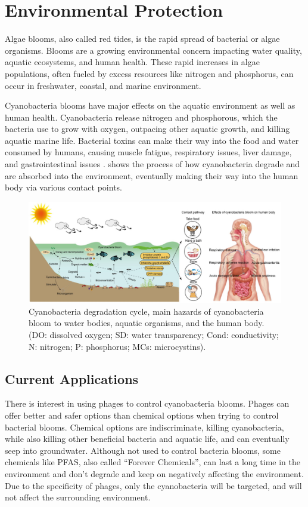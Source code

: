 \section{Environmental Protection}
\label{sec:AppendixB:environmental_protection}
Algae blooms, also called red tides, is the rapid spread of bacterial or algae organisms.
Blooms are a growing environmental concern impacting water quality, aquatic ecosystems, and human health.
These rapid increases in algae populations, often fueled by excess resources like nitrogen and phosphorus, can occur in freshwater, coastal, and marine environment. 

Cyanobacteria blooms have major effects on the aquatic environment as well as human health.
Cyanobacteria release nitrogen and phosphorous, which the bacteria use to grow with oxygen, outpacing other aquatic growth, and killing aquatic marine life.
Bacterial toxins can make their way into the food and water consumed by humans, causing muscle fatigue, respiratory issues, liver damage, and gastrointestinal issues \cite{zhangImpactCyanobacteriaBlooms2022}.
 shows the process of how cyanobacteria degrade and are absorbed into the environment, eventually making their way into the human body via various contact points.
 
\begin{figure}
    \centering
    \includegraphics[width=0.75\linewidth]{Figures/cyanobacteria_bloom_cycle.png} 
    \caption{Cyanobacteria degradation cycle, main hazards of cyanobacteria bloom to water bodies, aquatic organisms, and the human body. (DO: dissolved oxygen; SD: water transparency; Cond: conductivity; N: nitrogen; P: phosphorus; MCs: microcystins). \cite{zhangImpactCyanobacteriaBlooms2022}}
    \label{fig:cyanobacteria_bloom_cycle}
\end{figure}

\subsection{Current Applications}
    There is interest in using phages to control cyanobacteria blooms.
Phages can offer better and safer options than chemical options when trying to control bacterial blooms.
Chemical options are indiscriminate, killing cyanobacteria, while also killing other beneficial bacteria and aquatic life, and can eventually seep into groundwater.
Although not used to control bacteria blooms, some chemicals like PFAS, also called “Forever Chemicals”, can last a long time in the environment and don't degrade and keep on negatively affecting the environment.
Due to the specificity of phages, only the cyanobacteria will be targeted, and will not affect the surrounding environment. \newline

